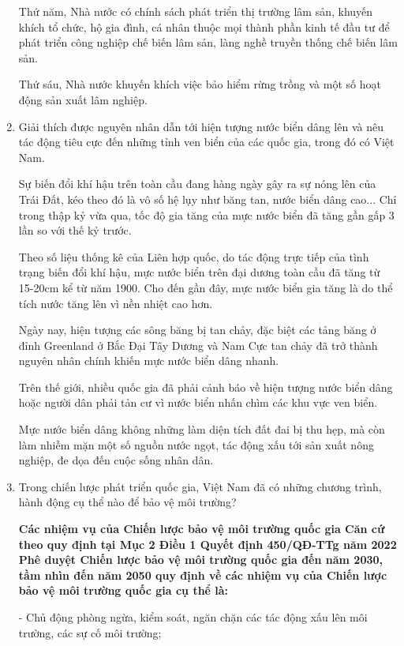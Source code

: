 \begin{enumerate}[label=\bfseries Câu \arabic*:]
{		Thứ năm, Nhà nước có chính sách phát triển thị trường lâm sản, khuyến khích tổ chức, hộ gia đình, cá nhân thuộc mọi thành phần kinh tế đầu tư để phát triển công nghiệp chế biến lâm sản, làng nghề truyền thống chế biến lâm sản.
		
		Thứ sáu, Nhà nước khuyến khích việc bảo hiểm rừng trồng và một số hoạt động sản xuất lâm nghiệp.
	}
	\item {}
	
	
	{
		Giải thích được nguyên nhân dẫn tới hiện tượng nước biển dâng lên và nêu tác động tiêu cực đến những tỉnh ven biển của các quốc gia, trong đó có Việt Nam.
	}
	
	\hideall
	{
		
		Sự biến đổi khí hậu trên toàn cầu đang hàng ngày gây ra sự nóng lên của Trái Đất, kéo theo đó là vô số hệ lụy như băng tan, nước biển dâng cao... Chỉ trong thập kỷ vừa qua, tốc độ gia tăng của mực nước biển đã tăng gần gấp 3 lần so với thế kỷ trước.
		
		Theo số liệu thống kê của Liên hợp quốc, do tác động trực tiếp của tình trạng biến đổi khí hậu, mực nước biển trên đại dương toàn cầu đã tăng từ 15-20cm kể từ năm 1900. Cho đến gần đây, mực nước biển gia tăng là do thể tích nước tăng lên vì nền nhiệt cao hơn.
		
		Ngày nay, hiện tượng các sông băng bị tan chảy, đặc biệt các tảng băng ở đỉnh Greenland ở Bắc Đại Tây Dương và Nam Cực tan chảy đã trở thành nguyên nhân chính khiến mực nước biển dâng nhanh.
		
		Trên thế giới, nhiều quốc gia đã phải cảnh báo về hiện tượng nước biển dâng hoặc người dân phải tản cư vì nước biển nhấn chìm các khu vực ven biển.
		
		Mực nước biển dâng không những làm diện tích đất đai bị thu hẹp, mà còn làm nhiễm mặn một số nguồn nước ngọt, tác động xấu tới sản xuất nông nghiệp, đe dọa đến cuộc sống nhân dân.
	}
	\item {}
	
	
	{
		Trong chiến lược phát triển quốc gia, Việt Nam đã có những chương trình, hành động cụ thể nào để bảo vệ môi trường?
	}
	
	\hideall
	{
		\textbf{Các nhiệm vụ của Chiến lược bảo vệ môi trường quốc gia
			Căn cứ theo quy định tại Mục 2 Điều 1 Quyết định 450/QĐ-TTg năm 2022 Phê duyệt Chiến lược bảo vệ môi trường quốc gia đến năm 2030, tầm nhìn đến năm 2050 quy định về các nhiệm vụ của Chiến lược bảo vệ môi trường quốc gia cụ thể là:}
		
		- Chủ động phòng ngừa, kiểm soát, ngăn chặn các tác động xấu lên môi trường, các sự cố môi trường;
		
}
\end{enumerate}
